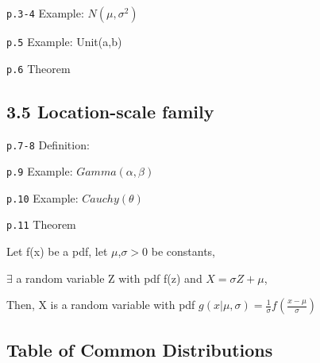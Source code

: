 \documentclass[]{tufte-book}
\begin{document}
\texttt{p.3-4} Example: \(N(\mu,\sigma^2)\)

\texttt{p.5} Example: Unit(a,b)

\texttt{p.6} Theorem

\hypertarget{location-scale-family}{%
\subsection{3.5 Location-scale family}\label{location-scale-family}}

\texttt{p.7-8} Definition:

\texttt{p.9} Example: \(Gamma(\alpha,\beta)\)

\texttt{p.10} Example: \(Cauchy(\theta)\)

\texttt{p.11} Theorem

Let f(x) be a pdf, let \(\mu\),\(\sigma>0\) be constants,

\(\exists\) a random variable Z with pdf f(z) and \(X=\sigma Z+\mu\),

Then, X is a random variable with pdf
\(g(x|\mu,\sigma)=\frac1\sigma f(\frac{x-\mu}{\sigma})\)

\hypertarget{table-of-common-distributions}{%
\subsection{Table of Common
Distributions}\label{table-of-common-distributions}}
\end{document}

